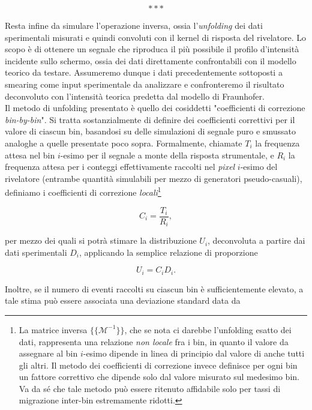\[* * * \] \medskip

\noindent Resta infine da simulare l'operazione inversa, ossia l'\emph{unfolding} dei dati sperimentali misurati e quindi convoluti con il kernel di risposta del rivelatore. Lo scopo è di ottenere un segnale che riproduca il più possibile il profilo d'intensità incidente sullo schermo, ossia dei dati direttamente confrontabili con il modello teorico da testare. Assumeremo dunque i dati precedentemente sottoposti a smearing come input sperimentale da analizzare e confronteremo il risultato deconvoluto con l'intensità teorica predetta dal modello di Fraunhofer.\\

\noindent Il metodo di unfolding presentato è quello dei cosiddetti "coefficienti di correzione \emph{bin-by-bin}".  Si tratta sostanzialmente di definire dei coefficienti correttivi per il valore di ciascun bin, basandosi su delle simulazioni di segnale puro e smussato analoghe a quelle presentate poco sopra. Formalmente, chiamate $T_i$ la frequenza attesa nel bin $i$-esimo per il segnale a monte della risposta strumentale, e $R_i$ la frequenza attesa per i conteggi effettivamente raccolti nel \emph{pixel} $i$-esimo del rivelatore (entrambe quantità simulabili per mezzo di generatori pseudo-casuali), definiamo i coefficienti di correzione \emph{locali}\footnote{La matrice inversa $\{\{\mathcal{M}^{-1}\}\}$, che se nota ci darebbe l'unfolding esatto dei dati, rappresenta una relazione \emph{non locale} fra i bin, in quanto il valore da assegnare al bin $i$-esimo dipende in linea di principio dal valore di anche tutti gli altri. Il metodo dei coefficienti di correzione invece definisce per ogni bin un fattore correttivo che dipende solo dal valore misurato sul medesimo bin. Va da sé che tale metodo può essere ritenuto affidabile solo per tassi di migrazione inter-bin estremamente ridotti.}

\begin{equation}
C_i = \frac{T_i}{R_i},
\end{equation}

\noindent per mezzo dei quali si potrà stimare la distribuzione $U_i$, deconvoluta a partire dai dati sperimentali $D_i$, applicando la semplice relazione di proporzione

\begin{equation}
U_i = C_i D_i.
\end{equation}

\noindent Inoltre, se il numero di eventi raccolti su ciascun bin è sufficientemente elevato, a tale stima può essere associata una deviazione standard data da

